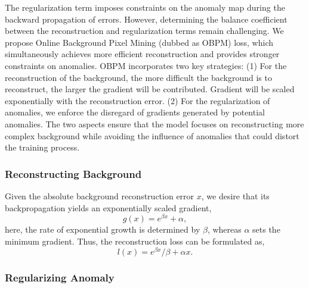 The regularization term imposes constraints on the anomaly map during the backward propagation of errors. However, determining the balance coefficient between the reconstruction and regularization terms remain challenging. We propose Online Background Pixel Mining (dubbed as OBPM) loss, which simultaneously achieves more efficient reconstruction and provides stronger constraints on anomalies. OBPM incorporates two key strategies: (1) For the reconstruction of the background, the more difficult the background is to reconstruct, the larger the gradient will be contributed. Gradient will be scaled exponentially with the reconstruction error. (2) For the regularization of anomalies, we enforce the disregard of gradients generated by potential anomalies. The two aspects ensure that the model focuses on reconstructing more complex background while avoiding the influence of anomalies that could distort the training process.

\subsubsection{Reconstructing Background}

Given the absolute background reconstruction error $x$, we desire that its backpropagation yields an exponentially scaled gradient,
\begin{equation}
    g(x) = e^{\beta x} + \alpha,
\end{equation}
here, the rate of exponential growth is determined by $\beta$, whereas $\alpha$ sets the minimum gradient. Thus, the reconstruction loss can be formulated as,
\begin{equation}
    l(x) = e^{\beta x} / {\beta} + \alpha x.
\end{equation}

\subsubsection{Regularizing Anomaly} 

